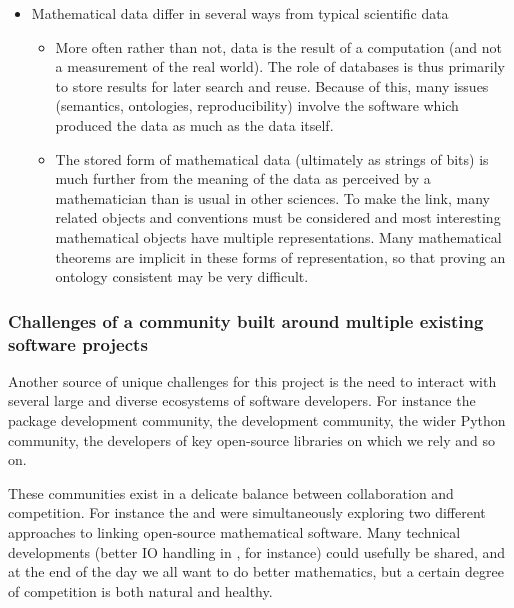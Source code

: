 \begin{itemize}
\item Mathematical data differ in several ways from typical
  scientific data
  \begin{itemize}
  \item More often rather than not, data is the result of a computation (and
    not a measurement of the real world). The role of databases is thus primarily
    to store results for later search and reuse. 
    Because of this, many issues (semantics, ontologies,
    reproducibility) involve the software which produced the data as
    much as the data itself.
  \item The stored form of mathematical data (ultimately as strings of
    bits) is much further from the meaning of the data as perceived
    by a mathematician than is usual in other sciences. To make the
    link, many related objects and conventions must be considered and
    most interesting mathematical objects have multiple
    representations. Many mathematical theorems are implicit in these
    forms of representation, so that proving an ontology consistent
    may be very difficult.
  \end{itemize}
\end{itemize}

\subsubsection{Challenges of a community built around multiple
  existing software projects}

Another source of unique challenges for this project is the need to
interact with several large and diverse ecosystems of software
developers. For instance the \GAP package development community, the
\Sage development community, the wider Python community, the developers
of key open-source libraries on which we rely and so on.

These communities exist in a delicate balance between collaboration
and competition. For instance the \scienceproject and \Sage were
simultaneously exploring two different approaches to linking
open-source mathematical software. Many technical developments (better
IO handling in \GAP, for instance) could usefully be shared, and at
the end of the day we all want to do better mathematics, but a certain
degree of competition is both natural and healthy.

